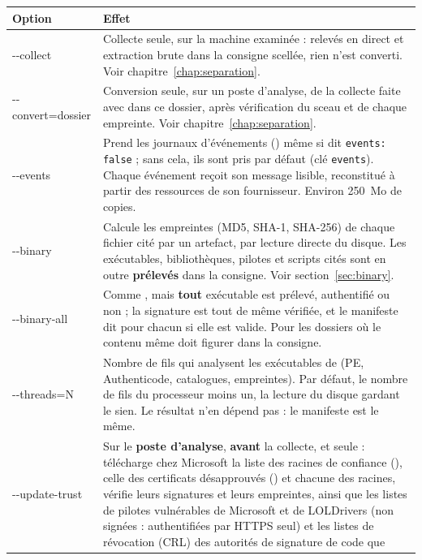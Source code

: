 \documentclass[11pt,a4paper,oneside]{report}
\begin{document}
\begin{longtable}{@{}>{\ttfamily}L{3.2cm}L{11.2cm}@{}}
\toprule
\normalfont\bfseries Option & \bfseries Effet \\
\midrule
\endhead
-{}-collect & Collecte seule, sur la machine examinée : relevés en direct et
  extraction brute dans la consigne scellée, rien n'est converti. Voir
  chapitre~\ref{chap:separation}. \\
-{}-convert=\newline dossier & Conversion seule, sur un poste d'analyse, de la collecte
  faite avec  dans ce dossier, après vérification du sceau et de
  chaque empreinte. Voir chapitre~\ref{chap:separation}. \\
-{}-events & Prend les journaux d'événements () même si
   dit \texttt{events: false} ; sans cela, ils sont pris par
  défaut (clé \texttt{events}). Chaque événement reçoit son message lisible,
  reconstitué à partir des ressources de son fournisseur. Environ 250~Mo de
  copies. \\
-{}-binary & Calcule les empreintes (MD5, SHA-1, SHA-256) de chaque fichier cité
  par un artefact, par lecture directe du disque. Les exécutables, bibliothèques,
  pilotes et scripts cités sont en outre \textbf{prélevés} dans la consigne. Voir
  section~\ref{sec:binary}. \\
-{}-binary-all & Comme , mais \textbf{tout} exécutable est prélevé,
  authentifié ou non ; la signature est tout de même vérifiée, et le manifeste
  dit pour chacun si elle est valide. Pour les dossiers où le contenu même doit
  figurer dans la consigne. \\
-{}-threads=N & Nombre de fils qui analysent les exécutables de 
   (PE, Authenticode, catalogues, empreintes). Par défaut, le nombre
  de fils du processeur moins un, la lecture du disque gardant le sien. Le
  résultat n'en dépend pas : le manifeste est le même. \\
-{}-update-trust\newline [=dossier] & Sur le \textbf{poste d'analyse}, \textbf{avant} la collecte, et
  seule : télécharge chez Microsoft la liste des racines de confiance
  (), celle des certificats désapprouvés
  () et chacune des racines, vérifie leurs
  signatures et leurs empreintes, ainsi que les listes de pilotes vulnérables
  de Microsoft et de LOLDrivers (non signées : authentifiées par HTTPS seul)
  et les listes de révocation (CRL) des autorités de signature de code que

\end{longtable}
\end{document}
